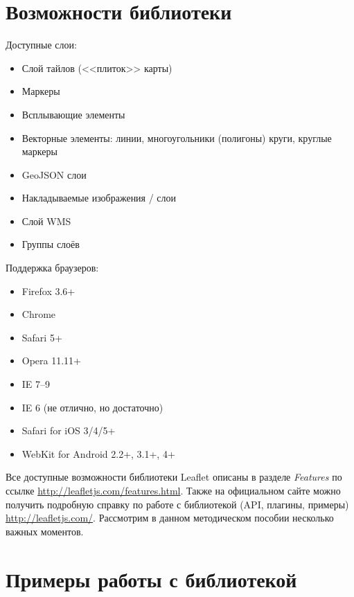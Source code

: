 \section{Возможности библиотеки}
Доступные слои:
\begin{itemize}
    \item Слой тайлов (<<плиток>> карты)
    \item Маркеры
    \item Всплывающие элементы
    \item Векторные элементы: линии, многоугольники (полигоны) круги, круглые 
        маркеры
    \item GeoJSON слои
    \item Накладываемые изображения / слои
    \item Слой WMS
    \item Группы слоёв
\end{itemize}

Поддержка браузеров:
\begin{itemize}
    \item Firefox 3.6+
    \item Chrome
    \item Safari 5+
    \item Opera 11.11+
    \item IE 7–9
    \item IE 6 (не отлично, но достаточно)
    \item Safari for iOS 3/4/5+
    \item WebKit for Android 2.2+, 3.1+, 4+
\end{itemize}

Все доступные возможности библиотеки Leaflet описаны в разделе 
\emph{Features} по ссылке \url{http://leafletjs.com/features.html}. 
Также на официальном сайте можно получить подробную справку по 
работе с библиотекой (API, плагины, примеры) \url{http://leafletjs.com/}. 
Рассмотрим в данном методическом пособии несколько важных моментов.

\section{Примеры работы с библиотекой}

